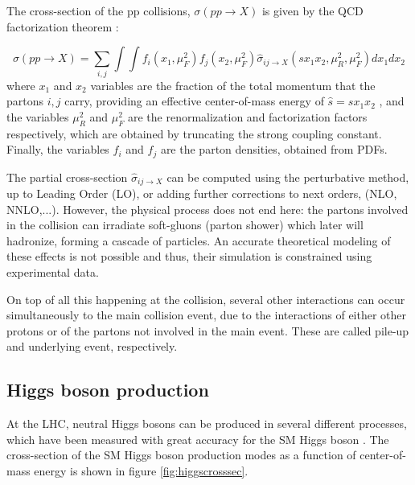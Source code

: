 The cross-section of the pp collisions, $\sigma(pp\rightarrow X)$ is given by the QCD factorization theorem \cite{Butterworth:2012fj}:

\begin{equation}
    \sigma(pp\rightarrow X) = \sum_{i,j} \int \int f_i (x_1 , \mu_F^2 )f_j (x_2 , \mu_F^2 ) \hat{\sigma}_{ij \rightarrow X} (s x_1 x_2 , \mu_R^2 , \mu_F^2 ) dx_1 dx_2 
\end{equation}
where $x_1$ and $x_2$ variables are the fraction of the total momentum that the partons $i,j$ carry, providing an effective center-of-mass energy of $\hat{s} = sx_1 x_2$ , and the variables $\mu_R^2$ and $\mu_F^2$ are the renormalization and factorization factors respectively, which are obtained by truncating the strong coupling constant. Finally, the variables $f_i$ and $f_j$ are the parton densities, obtained from PDFs.

The partial cross-section $\hat{\sigma}_{ij \rightarrow X}$ can be computed using the perturbative method, up to Leading Order (LO), or adding further corrections to next orders, (NLO, NNLO,...). However, the physical process does not end here: the partons involved in the collision can irradiate soft-gluons (parton shower) which later will hadronize, forming a cascade of particles. An accurate theoretical modeling of these effects is not possible and thus, their simulation is constrained using experimental data.

On top of all this happening at the collision, several other interactions can occur simultaneously to the main collision event, due to the interactions of either other protons or of the partons not involved in the main event. These are called pile-up and underlying event, respectively.

\subsection{Higgs boson production}

At the LHC, neutral Higgs bosons can be produced in several different processes, which have been measured with great accuracy for the SM Higgs boson \cite{Dittmaier:1318996}. The cross-section of the SM Higgs boson production modes as a function of center-of-mass energy is shown in figure \ref{fig:higgscrosssec}.


